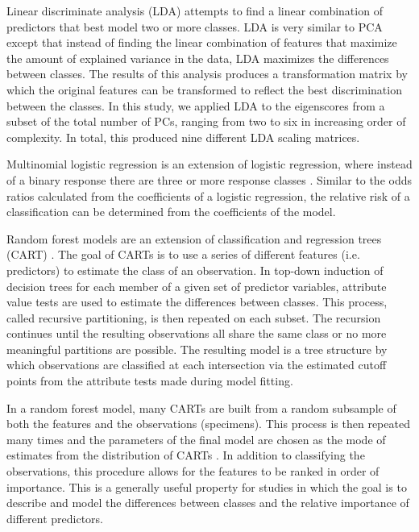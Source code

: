 \documentclass[12pt,letterpaper]{article}
\begin{document}
Linear discriminate analysis (LDA) attempts to find a linear combination of predictors that best model two or more classes. LDA is very similar to PCA except that instead of finding the linear combination of features that maximize the amount of explained variance in the data, LDA maximizes the differences between classes. The results of this analysis produces a transformation matrix by which the original features can be transformed to reflect the best discrimination between the classes. In this study, we applied LDA to the eigenscores from a subset of the total number of PCs, ranging from two to six in increasing order of complexity. In total, this produced nine different LDA scaling matrices. 

Multinomial logistic regression is an extension of logistic regression, where instead of a binary response there are three or more response classes \citep{Venables2002a}. Similar to the odds ratios calculated from the coefficients of a logistic regression, the relative risk of a classification can be determined from the coefficients of the model.

Random forest models are an extension of classification and regression trees (CART) \citep{Breiman1984,Breiman2001}. The goal of CARTs is to use a series of different features (i.e. predictors) to estimate the class of an observation. In top-down induction of decision trees for each member of a given set of predictor variables, attribute value tests are used to estimate the differences between classes. This process, called recursive partitioning, is then repeated on each subset. The recursion continues until the resulting observations all share the same class or no more meaningful partitions are possible. The resulting model is a tree structure by which observations are classified at each intersection via the estimated cutoff points from the attribute tests made during model fitting. %

In a random forest model, many CARTs are built from a random subsample of both the features and the observations (specimens). This process is then repeated many times and the parameters of the final model are chosen as the mode of estimates from the distribution of CARTs \citep{Breiman2001}. In addition to classifying the observations, this procedure allows for the features to be ranked in order of importance. This is a generally useful property for studies in which the goal is to describe and model the differences between classes and the relative importance of different predictors. 
\end{document}
